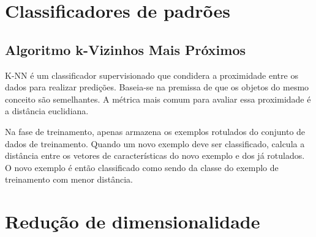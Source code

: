 \section{Classificadores de padrões}
\label{cap:classificadores}





\subsection{Algoritmo k-Vizinhos Mais Próximos}

K-NN é um classificador supervisionado que condidera a proximidade entre os dados para realizar predições. Baseia-se na premissa de que os objetos do mesmo conceito são semelhantes. A métrica mais comum para avaliar essa proximidade é a distância euclidiana.

Na fase de treinamento, apenas armazena os exemplos rotulados do conjunto de dados de treinamento. Quando um novo exemplo deve ser classificado, calcula a distância entre os vetores de características do novo exemplo e dos já rotulados. O novo exemplo é então classificado como sendo da classe do exemplo de treinamento com menor distância.


\section{Redução de dimensionalidade}
\label{sec:vis}

